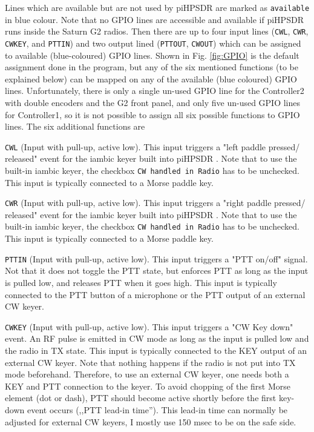 \documentclass[12pt]{book}
\def\rett#1{\texttt{\color{red}#1}}
\def\bltt#1{\texttt{\color{blue}#1}}
\def\pH{pi\-HPSDR }
\begin{document}
Lines which are available but are not used by \pH are marked as \texttt{available} in blue colour.
{\color{red} Note that no GPIO lines are accessible and available if \pH runs inside the Saturn G2 radios.}
Then there are up to four input lines (\texttt{CWL}, \texttt{CWR}, \texttt{CWKEY}, and \texttt{PTTIN})
and two output lined (\texttt{PTTOUT}, \texttt{CWOUT}) which can be assigned to available (blue-coloured)
GPIO lines. Shown in Fig. \ref{fig:GPIO} is the default assignment done in the program, but any of the
six mentioned functions (to be explained below) can be mapped on any of the available (blue coloured)
GPIO lines. Unfortunately, there is only a single un-used GPIO line for the Controller2 with double
encoders and the G2 front panel, and only five un-used GPIO lines for Controller1, so it is not possible
to assign all six possible functions to GPIO lines. The six additional functions are

\rett{CWL} (Input with pull-up, active low). This input triggers a "left paddle pressed/
released" event for the
iambic keyer built into \pH. Note that to use the built-in iambic keyer, the checkbox
\bltt{CW handled in Radio} has to be unchecked. This input is typically connected to
a Morse paddle key.

\rett{CWR} (Input with pull-up, active low). This input triggers a "right paddle pressed/
released" event for the
iambic keyer built into \pH. Note that to use the built-in iambic keyer, the checkbox
\bltt{CW handled in Radio} has to be unchecked. This input is typically connected to
a Morse paddle key.


\rett{PTTIN} (Input with pull-up, active low). This input triggers a "PTT on/off" signal.
Not that it does not toggle the PTT state, but enforces PTT as long as the input is pulled low,
and releases PTT when it goes high. This input is typically connected to the PTT button of
a microphone or the PTT output of an external CW keyer.

\rett{CWKEY} (Input with pull-up, active low). This input triggers a "CW Key down" event. An
RF pulse is emitted in CW mode as long as the input is pulled low and the radio in TX state.
This input is typically connected to the KEY output of an external CW keyer.  Note that  nothing
happens if the radio is not put into TX mode beforehand. Therefore, to use an external CW keyer,
one needs both a KEY and PTT connection to the keyer. To avoid chopping of the first Morse element
(dot or dash), PTT should become active shortly before the first key-down event occurs (,,PTT
lead-in time''). This lead-in time can normally be adjusted for external CW keyers, I mostly use
150 msec to be on the safe side.
\end{document}

